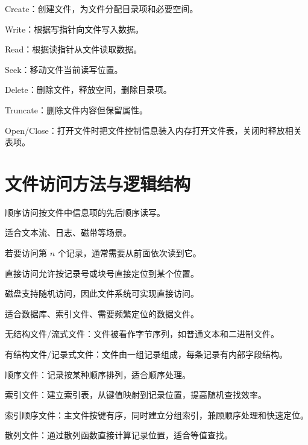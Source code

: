 \begin{points}
  \item Create：创建文件，为文件分配目录项和必要空间。
  \item Write：根据写指针向文件写入数据。
  \item Read：根据读指针从文件读取数据。
  \item Seek：移动文件当前读写位置。
  \item Delete：删除文件，释放空间，删除目录项。
  \item Truncate：删除文件内容但保留属性。
  \item Open/Close：打开文件时把文件控制信息装入内存打开文件表，关闭时释放相关表项。
\end{points}


\section{文件访问方法与逻辑结构}
\begin{points}
  \item 顺序访问按文件中信息项的先后顺序读写。
  \item 适合文本流、日志、磁带等场景。
  \item 若要访问第 $n$ 个记录，通常需要从前面依次读到它。
\end{points}


\begin{points}
  \item 直接访问允许按记录号或块号直接定位到某个位置。
  \item 磁盘支持随机访问，因此文件系统可实现直接访问。
  \item 适合数据库、索引文件、需要频繁定位的数据文件。
\end{points}


\begin{points}
  \item 无结构文件/流式文件：文件被看作字节序列，如普通文本和二进制文件。
  \item 有结构文件/记录式文件：文件由一组记录组成，每条记录有内部字段结构。
  \item 顺序文件：记录按某种顺序排列，适合顺序处理。
  \item 索引文件：建立索引表，从键值映射到记录位置，提高随机查找效率。
  \item 索引顺序文件：主文件按键有序，同时建立分组索引，兼顾顺序处理和快速定位。
  \item 散列文件：通过散列函数直接计算记录位置，适合等值查找。
\end{points}


